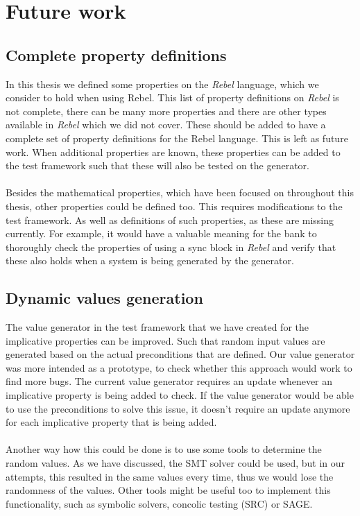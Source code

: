 \section{Future work}
\subsection*{Complete property definitions}
In this thesis we defined some properties on the \textit{Rebel} language, which we consider to hold when using Rebel. This list of property definitions on \textit{Rebel} is not complete, there can be many more properties and there are other types available in \textit{Rebel} which we did not cover. These should be added to have a complete set of property definitions for the Rebel language. This is left as future work. When additional properties are known, these properties can be added to the test framework such that these will also be tested on the generator.\\
\\
Besides the mathematical properties, which have been focused on throughout this thesis, other properties could be defined too. This requires modifications to the test framework. As well as definitions of such properties, as these are missing currently. For example, it would have a valuable meaning for the bank to thoroughly check the properties of using a sync block in \textit{Rebel} and verify that these also holds when a system is being generated by the generator.

\subsection*{Dynamic values generation}
The value generator in the test framework that we have created for the implicative properties can be improved. Such that random input values are generated based on the actual preconditions that are defined. Our value generator was more intended as a prototype, to check whether this approach would work to find more bugs. The current value generator requires an update whenever an implicative property is being added to check. If the value generator would be able to use the preconditions to solve this issue, it doesn't require an update anymore for each implicative property that is being added.\\
\\
Another way how this could be done is to use some tools to determine the random values. As we have discussed, the SMT solver could be used, but in our attempts, this resulted in the same values every time, thus we would lose the randomness of the values. Other tools might be useful too to implement this functionality, such as symbolic solvers, concolic testing (SRC) or SAGE. 

